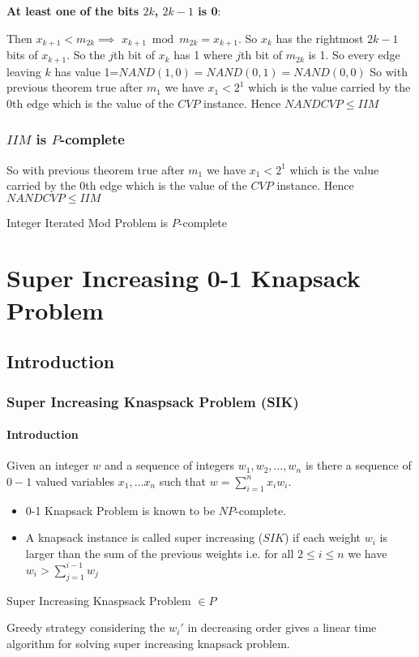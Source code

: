 \documentclass[article,8pt]{beamer}%
\begin{document}
\begin{frame}[allowframebreaks]
\textbf{At least one of the bits $2k$, $2k-1$ is 0}: 

Then $x_{k+1}<m_{2k}\implies$ $x_{k+1}\bmod{m_{2k}}=x_{k+1}$. So $x_{k}$ has the rightmost $2k-1$ bits of $x_{k+1}$. So the $j$th bit of $x_k$ has 1 where $j$th bit of $m_{2k}$ is 1. So every edge leaving $k$ has value 1=$NAND(1,0)=NAND(0,1)=NAND(0,0)$
So with previous theorem true after $m_1$ we have $x_1< 2^{1}$ which is the value carried by the $0$th edge which is the value of the $CVP$ instance. Hence $NANDCVP\leq IIM$
\end{frame}

\begin{frame}
	\frametitle{$IIM$ is $P$-complete}

So with previous theorem true after $m_1$ we have $x_1< 2^{1}$ which is the value carried by the $0$th edge which is the value of the $CVP$ instance. Hence $NANDCVP\leq IIM$
	 	\vspace{5mm}
	 	
	\begin{theorem}
		Integer Iterated Mod Problem is $P$-complete
	\end{theorem}
\end{frame}
\section{Super Increasing 0-1 Knapsack Problem}
\subsection{Introduction}
\begin{frame}
\frametitle{Super Increasing Knaspsack Problem (SIK)}
\framesubtitle{Introduction}
\begin{definition}
	Given an integer $w$ and a sequence of integers $w_1,w_2,\dots, w_n$ is there a sequence of $0-1$ valued variables $x_1,\dots x_n$ such that $w=\sum\limits_{i=1}^n x_iw_i$.
\end{definition}
\begin{itemize}
	\item 0-1 Knapsack Problem is known to be $NP$-complete. \cite{guidetonpc}
	\item A knapsack instance is called super increasing ($SIK$) if each weight $w_i$ is larger than the sum of the previous weights i.e. for all $2\leq i\leq n$ we have $w_i>\sum\limits_{j=1}^{i-1}w_j$
\end{itemize}
\begin{theorem}
	Super Increasing Knaspsack Problem $\in P$
\end{theorem}
Greedy strategy considering the $w_i'$ in decreasing order gives a linear time algorithm for solving super increasing knapsack problem.
\end{frame}
\end{document}
